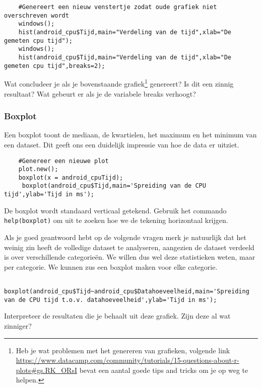 \begin{lstlisting}
	#Genereert een nieuw venstertje zodat oude grafiek niet overschreven wordt
	windows();
	hist(android_cpu$Tijd,main="Verdeling van de tijd",xlab="De gemeten cpu tijd");
	windows();
	hist(android_cpu$Tijd,main="Verdeling van de tijd",xlab="De gemeten cpu tijd",breaks=2);
\end{lstlisting}
\begin{exercise}
	Wat concludeer je als je bovenstaande grafiek\footnote{Heb je wat problemen met het genereren van grafieken, volgende link \url{https://www.datacamp.com/community/tutorials/15-questions-about-r-plots\#gs.RK_ORsI} bevat een aantal goede tips and tricks om je op weg te helpen.} genereert? Is dit een zinnig resultaat? Wat gebeurt er als je de variabele breaks verhoogt?
\end{exercise}

\subsubsection{Boxplot}
Een boxplot toont de mediaan, de kwartielen, het maximum en het minimum van een dataset. Dit geeft ons een duidelijk impressie van hoe de data er uitziet.

\begin{lstlisting}
	#Genereer een nieuwe plot
	plot.new();
	boxplot(x = android_cpuTijd);
	 boxplot(android_cpu$Tijd,main='Spreiding van de CPU tijd',ylab='Tijd in ms');
\end{lstlisting} 

\begin{exercise}
	De boxplot wordt standaard verticaal getekend. Gebruik het commando \texttt{help(boxplot)} om uit te zoeken hoe we de tekening horizontaal krijgen. 
\end{exercise}

Als je goed geantwoord hebt op de volgende vragen merk je natuurlijk dat het weinig zin heeft de volledige dataset te analyseren, aangezien de dataset verdeeld is over verschillende categorie\"en. We willen dus wel deze statistieken weten, maar per categorie. We kunnen zus een boxplot maken voor elke categorie.

\begin{lstlisting}
	boxplot(android_cpu$Tijd~android_cpu$Datahoeveelheid,main='Spreiding van de CPU tijd t.o.v. datahoeveelheid',ylab='Tijd in ms');
\end{lstlisting}

\begin{exercise}
	\label{ex:boxplot}
	Interpreteer de resultaten die je behaalt uit deze grafiek. Zijn deze al wat zinniger?
\end{exercise}

